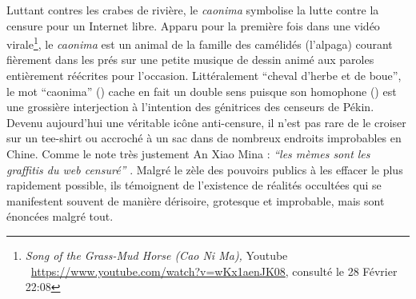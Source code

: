 \begin{description}
Luttant contres les crabes de rivière, le \textit{caonima }symbolise la lutte contre la censure pour un Internet libre. Apparu pour la première fois dans une vidéo virale\footnote{ \textit{Song of the Grass-Mud Horse (Cao Ni Ma), }Youtube \ \url{https://www.youtube.com/watch?v=wKx1aenJK08}, consulté le 28 Février 22:08\par }, le \textit{caonima} est un animal de la famille des camélidés (l{\textquoteright}alpaga) courant fièrement dans les prés sur une petite musique de dessin animé aux paroles entièrement réécrites pour l{\textquoteright}occasion. Littéralement {\textquotedblleft}cheval d{\textquoteright}herbe et de boue{\textquotedblright}, le mot {\textquotedblleft}caonima{\textquotedblright} () cache en fait un double sens puisque son homophone () est une grossière interjection à l{\textquoteright}intention des génitrices des censeurs de Pékin. Devenu aujourd{\textquoteright}hui une véritable icône anti-censure, il n{\textquoteright}est pas rare de le croiser sur un tee-shirt ou accroché à un sac dans de nombreux endroits improbables en Chine. Comme le note très justement An Xiao Mina : \textit{{\textquotedblleft}les mèmes sont les graffitis du web censuré{\textquotedblright}} \citep{Mina2012}. Malgré le zèle des pouvoirs publics à les effacer le plus rapidement possible, ils témoignent de l{\textquoteright}existence de réalités occultées qui se manifestent souvent de manière dérisoire, grotesque et improbable, mais sont énoncées malgré tout. 


\end{description}
